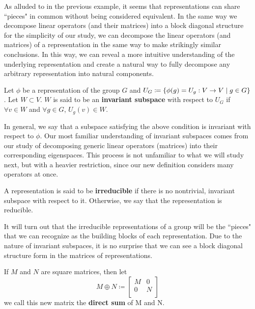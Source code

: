 As alluded to in the previous example, it seems that representations can share ``pieces" in common without being considered equivalent. In the same way we decompose linear operators (and their matrices) into a block diagonal structure for the simplicity of our study, we can decompose the linear operators (and matrices) of a representation in the same way to make strikingly similar conclusions. In this way, we can reveal a more intuitive understanding of the underlying representation and create a natural way to fully decompose any arbitrary representation into natural components. 

\begin{definition}
	Let $\phi$ be a representation of the group $G$ and $U_G \coloneq \{\phi(g)=U_g: V\rightarrow V \hspace{1mm}| \hspace{1mm} g\in G\}$. Let $W \subset V$. $W$ is said to be an \textbf{invariant subspace} with respect to $U_G$ if $\forall v \in W$ and $\forall g \in G$, $U_g(v)\in W$.
\end{definition}

In general, we say that a subspace satisfying the above condition is invariant with respect to $\phi$. Our most familiar understanding of invariant subspaces comes from our study of decomposing generic linear operators (matrices) into their corresponding eigenspaces. This process is not unfamiliar to what we will study next, but with a heavier restriction, since our new definition considers many operators at once.

\begin{definition}
	A representation is said to be \textbf{irreducible} if there is no nontrivial, invariant subspace with respect to it. Otherwise, we say that the representation is reducible.
\end{definition}

It will turn out that the irreducible representations of a group will be the ``pieces" that we can recognize as the building blocks of each representation. Due to the nature of invariant subspaces, it is no surprise that we can see a block diagonal structure form in the matrices of representations.

\begin{definition}
	If $M$ and $N$ are square matrices, then let $$M\oplus N \coloneq \begin{bmatrix}
																			M & 0\\
																			0 & N\\
																		\end{bmatrix}$$
	we call this new matrix the \textbf{direct sum} of M and N.
\end{definition}

